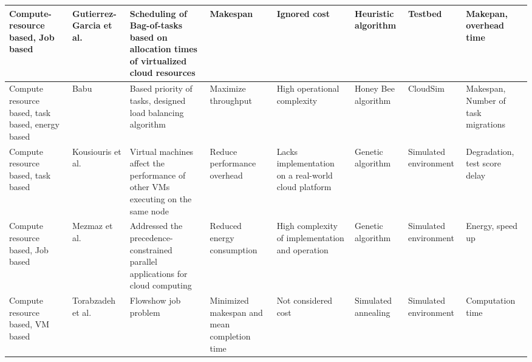 \begin{sidewaystable*}[!htbp]
{\begin{tabular}{|g{2cm} p{2cm} p{2cm} p{2cm} p{2cm} p{2cm} p{2cm} p{2cm}|}
 Compute-resource based, Job based & Gutierrez-Garcia et al.~\cite{gutierrez2013family} & Scheduling of Bag-of-tasks based on allocation times of virtualized cloud resources & Makespan & Ignored cost & Heuristic algorithm &  Testbed & Makepan, overhead time
\\ \hline

Compute resource based, task based, energy based & Babu~\cite{ld2013honey} & Based  priority of tasks, designed load balancing algorithm & Maximize throughput & High operational complexity & Honey Bee algorithm & CloudSim & Makespan, Number of task migrations 
\\ \hline

Compute resource based, task based & Kousiouris et al.~\cite{kousiouris2011effects}& Virtual machines affect the performance of other VMs executing on the same node & Reduce performance overhead & Lacks implementation on a real-world cloud platform  & Genetic algorithm  &  Simulated environment & Degradation, test score delay 
\\ \hline

Compute resource based, Job based & Mezmaz et al.~\cite{mezmaz2011parallel} & Addressed the precedence-constrained parallel applications for cloud computing & Reduced energy consumption & High complexity of implementation and operation& Genetic algorithm & Simulated environment & Energy, speed up 
\\ \hline


Compute resource based, VM based & Torabzadeh et al.~\cite{torabzadeh2010cloud} & Flowshow job problem  & Minimized makespan and mean completion time & Not considered cost & Simulated annealing & Simulated environment & Computation time 
\\ \hline


\end{tabular}
}

\end{sidewaystable*}
